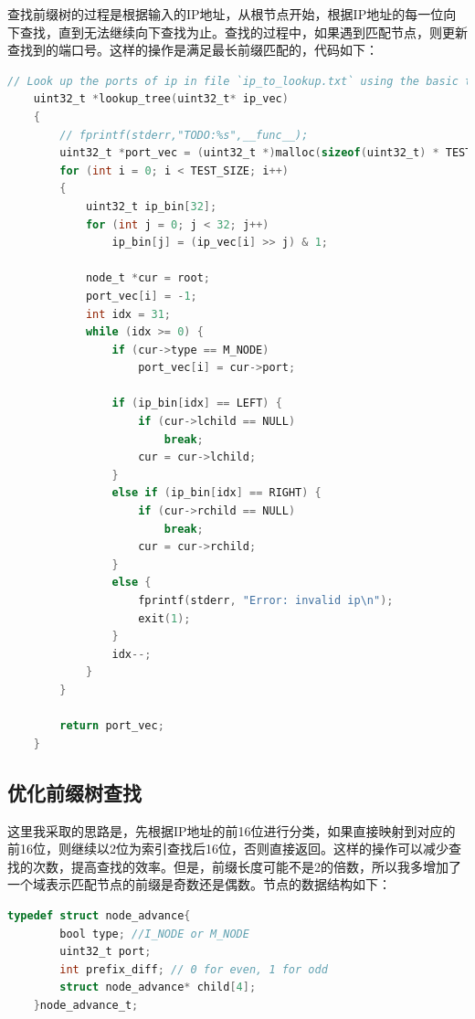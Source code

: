 \documentclass[UTF8]{report}
\begin{document}
查找前缀树的过程是根据输入的IP地址，从根节点开始，根据IP地址的每一位向下查找，直到无法继续向下查找为止。查找的过程中，如果遇到匹配节点，则更新查找到的端口号。这样的操作是满足最长前缀匹配的，代码如下：

\begin{lstlisting}[language=C]
    // Look up the ports of ip in file `ip_to_lookup.txt` using the basic tree, input is read from `read_test_data` func 
    uint32_t *lookup_tree(uint32_t* ip_vec)
    {
        // fprintf(stderr,"TODO:%s",__func__);
        uint32_t *port_vec = (uint32_t *)malloc(sizeof(uint32_t) * TEST_SIZE);
        for (int i = 0; i < TEST_SIZE; i++)
        {
            uint32_t ip_bin[32];
            for (int j = 0; j < 32; j++) 
                ip_bin[j] = (ip_vec[i] >> j) & 1;
                    
            node_t *cur = root;
            port_vec[i] = -1;
            int idx = 31;
            while (idx >= 0) {
                if (cur->type == M_NODE) 
                    port_vec[i] = cur->port;
                
                if (ip_bin[idx] == LEFT) {
                    if (cur->lchild == NULL) 
                        break;
                    cur = cur->lchild;
                }
                else if (ip_bin[idx] == RIGHT) {
                    if (cur->rchild == NULL) 
                        break;
                    cur = cur->rchild;
                }
                else {
                    fprintf(stderr, "Error: invalid ip\n");
                    exit(1);
                }
                idx--;
            }
        }
    
        return port_vec;
    }    
\end{lstlisting}

\subsection{优化前缀树查找}

这里我采取的思路是，先根据IP地址的前16位进行分类，如果直接映射到对应的前16位，则继续以2位为索引查找后16位，否则直接返回。这样的操作可以减少查找的次数，提高查找的效率。但是，前缀长度可能不是2的倍数，所以我多增加了一个域表示匹配节点的前缀是奇数还是偶数。节点的数据结构如下：

\begin{lstlisting}[language=C]
    typedef struct node_advance{
        bool type; //I_NODE or M_NODE
        uint32_t port;
        int prefix_diff; // 0 for even, 1 for odd
        struct node_advance* child[4];
    }node_advance_t;
\end{lstlisting}    
\end{document}
